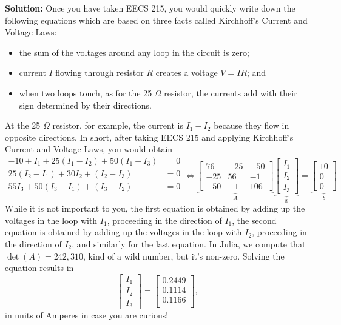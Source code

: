 \textbf{Solution:}
Once you have taken EECS 215, you would quickly write down the following equations which are based on three  facts called Kirchhoff's Current and Voltage Laws:
\begin{itemize}
    \item the sum of the voltages around any loop in the circuit is zero;
    \item current $I$ flowing through resistor $R$ creates a voltage $V = I R$; and 
    \item when two loops touch, as for the 25 $\Omega$ resistor, the currents add with their sign determined by their directions.
\end{itemize}
 At the 25 $\Omega$  resistor, for example, the current is $I_1 - I_2$ because they flow in opposite directions.  In short, after taking EECS 215 and applying Kirchhoff's Current and Voltage Laws, you would obtain
\begin{equation}
\label{eq:circuitb}
\begin{aligned}
-10 + I_1 + 25 (I_1 - I_2) + 50 (I_1 - I_3) &=0 \\
25 (I_2-I_1) + 30 I_2 + (I_2 - I_3)&=0\\
55 I_3 + 50 (I_3 - I_1) + (I_3-I_2) &=0 \\
\end{aligned}
\iff \underbrace{\left[\begin{array}{rrr} 76 & -25 & -50 \\
-25 & 56 & -1  \\ -50 & -1 & 106\end{array}\right]}_{A} \underbrace{\left[\begin{array}{c} I_1\\ I_2 \\ I_3\end{array}\right]}_{x} =   \underbrace{\left[\begin{array}{c} 10\\ 0\\ 0 \end{array}\right]}_{b}
\end{equation}
While it is not important to you, the first equation is obtained by adding up the voltages in the loop with $I_1$, proceeding in the direction of $I_1$, the second equation is obtained by adding up the voltages in the loop with $I_2$, proceeding in the direction of $I_2$, and similarly for the last equation. 
In Julia, we compute that $\det(A)=242,310$, kind of a wild number, but it's non-zero. Solving the equation results in 
$$\left[\begin{array}{c} I_1\\ I_2 \\ I_3\end{array}\right] =  \left[
\begin{array}{c}
0.2449 \\
0.1114 \\
0.1166 \\
\end{array}
\right],$$
in units of Amperes in case you are curious!
\Qed

